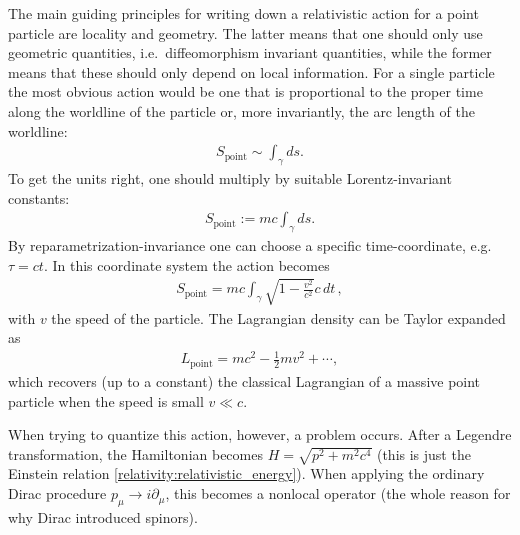     The main guiding principles for writing down a relativistic action for a point particle are locality and geometry. The latter means that one should only use geometric quantities, i.e.~diffeomorphism invariant quantities, while the former means that these should only depend on local information. For a single particle the most obvious action would be one that is proportional to the proper time along the worldline of the particle or, more invariantly, the arc length of the worldline:
    \begin{gather}
        S_\mathrm{point}\sim\int_\gamma ds.
    \end{gather}
    To get the units right, one should multiply by suitable Lorentz-invariant constants:
    \begin{gather}
        \label{relativity:worldline_action}
        S_\mathrm{point}:=mc\int_\gamma ds.
    \end{gather}
    By reparametrization-invariance one can choose a specific time-coordinate, e.g.~$\tau=ct$. In this coordinate system the action becomes
    \begin{gather}
        S_\mathrm{point}=mc\int_\gamma\sqrt{1-\frac{v^2}{c^2}}c\,dt\,,
    \end{gather}
    with $v$ the speed of the particle. The Lagrangian density can be Taylor expanded as
    \begin{gather}
        L_\mathrm{point}=mc^2 - \frac{1}{2}mv^2 + \cdots,
    \end{gather}
    which recovers (up to a constant) the classical Lagrangian of a massive point particle when the speed is small $v\ll c$.

    When trying to quantize this action, however, a problem occurs. After a Legendre transformation, the Hamiltonian becomes $H=\sqrt{p^2+m^2c^4}$ (this is just the Einstein relation \ref{relativity:relativistic_energy}). When applying the ordinary Dirac procedure $p_\mu\longrightarrow i\partial_\mu$, this becomes a nonlocal operator (the whole reason for why Dirac introduced spinors).

